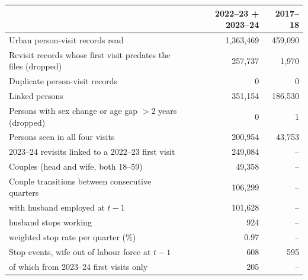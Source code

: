 \begin{tabular}{lrr}
\toprule
 & 2022--23 + 2023--24 & 2017--18 \\
\midrule
Urban person-visit records read & 1,363,469 & 459,090 \\
Revisit records whose first visit predates the files (dropped) & 257,737 & 1,970 \\
Duplicate person-visit records & 0 & 0 \\
Linked persons & 351,154 & 186,530 \\
Persons with sex change or age gap $>2$ years (dropped) & 0 & 1 \\
Persons seen in all four visits & 200,954 & 43,753 \\
2023--24 revisits linked to a 2022--23 first visit & 249,084 & -- \\
Couples (head and wife, both 18--59) & 49,358 & -- \\
Couple transitions between consecutive quarters & 106,299 & -- \\
\quad with husband employed at $t-1$ & 101,628 & -- \\
\quad husband stops working & 924 & -- \\
\quad weighted stop rate per quarter (\%) & 0.97 & -- \\
Stop events, wife out of labour force at $t-1$ & 608 & 595 \\
\quad of which from 2023--24 first visits only & 205 & -- \\
\bottomrule
\end{tabular}
